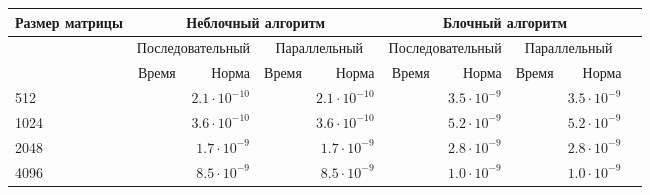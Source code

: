 \documentclass[12pt,a4paper]{article}
\begin{document}
\begin{table}[!htp]
    \centering
    \scriptsize
    \begin{tabular}{|l|r|r|r|r|r|r|r|r|r|}
    \hline
    \textbf{Размер матрицы} &\multicolumn{4}{c}{\textbf{Неблочный алгоритм}} &\multicolumn{4}{|c|}{\textbf{Блочный алгоритм}} \\
    \hline
    &\multicolumn{2}{c|}{Последовательный} &\multicolumn{2}{c}{Параллельный} &\multicolumn{2}{|c}{Последовательный} &\multicolumn{2}{|c|}{Параллельный} \\
    \hline
    &Время &Норма &Время &Норма &Время &Норма &Время &Норма \\
    \hline
    512 & &$2.1 \cdot 10^{-10}$ & &$2.1 \cdot 10^{-10}$ & &$3.5 \cdot 10^{-9}$ & &$3.5 \cdot 10^{-9}$ \\
    \hline
    1024 & &$3.6 \cdot 10^{-10}$ & &$3.6 \cdot 10^{-10}$ & &$5.2 \cdot 10^{-9}$ & &$5.2 \cdot 10^{-9}$ \\
    \hline
    2048 & &$1.7 \cdot 10^{-9}$ & &$1.7 \cdot 10^{-9}$ & &$2.8 \cdot 10^{-9}$ & &$2.8 \cdot 10^{-9}$ \\
    \hline
    4096 & &$8.5 \cdot 10^{-9}$ & &$8.5 \cdot 10^{-9}$ & &$1.0 \cdot 10^{-9}$ & &$1.0 \cdot 10^{-9}$ \\
    \hline
    \end{tabular}
    \end{table}
\end{document}
